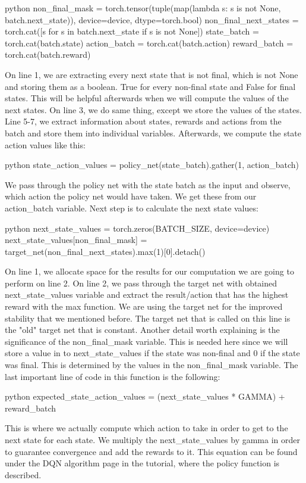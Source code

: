 \documentclass{article}
\numberwithin{equation}{section}
\numberwithin{equation}{section}
\begin{document}
\begin{mintedbox}{python}
non_final_mask = torch.tensor(tuple(map(lambda s: s is not None,
                                          batch.next_state)), device=device, dtype=torch.bool)
    non_final_next_states = torch.cat([s for s in batch.next_state
                                                if s is not None])
    state_batch = torch.cat(batch.state)
    action_batch = torch.cat(batch.action)
    reward_batch = torch.cat(batch.reward)
\end{mintedbox} 

On line 1, we are extracting every next state that is not final, which is not None and storing them as a boolean. True for every non-final state and False for final states. This will be helpful afterwards when we will compute the values of the next states. On line 3, we do same thing, except we store the values of the states. Line 5-7, we extract information about states, rewards and actions from the batch and store them into individual variables. Afterwards, we compute the state action values like this:

\begin{mintedbox}{python}
state_action_values = policy_net(state_batch).gather(1, action_batch)
\end{mintedbox}

We pass through the policy net with the state batch as the input and observe, which action the policy net would have taken. We get these from our action\_batch variable. Next step is to calculate the next state values:

\begin{mintedbox}{python}
next_state_values = torch.zeros(BATCH_SIZE, device=device)
next_state_values[non_final_mask] = target_net(non_final_next_states).max(1)[0].detach()
\end{mintedbox}

On line 1, we allocate space for the results for our computation we are going to perform on line 2. On line 2, we pass through the target net with obtained next\_state\_values variable and extract the result/action that has the highest reward with the max function. We are using the target net for the improved stability that we mentioned before. The target net that is called on this line is the "old" target net that is constant. Another detail worth explaining is the significance of the non\_final\_mask variable. This is needed here since we will store a value in to next\_state\_values if the state was non-final and 0 if the state was final. This is determined by the values in the non\_final\_mask variable. The last important line of code in this function is the following:
\begin{mintedbox}{python}
expected_state_action_values = (next_state_values * GAMMA) + reward_batch
\end{mintedbox} 
This is where we actually compute which action to take in order to get to the next state for each state. We multiply the next\_state\_values by gamma in order to guarantee convergence and add the rewards to it. This equation can be found under the DQN algorithm page in the tutorial, where the policy function is described. \\
\end{document}
